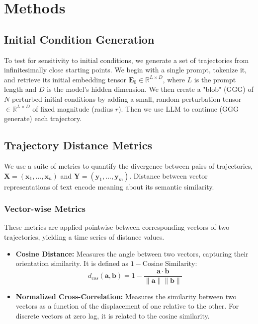 \documentclass[a4paper,12pt]{article}
\begin{document}

\section{Methods}

\subsection{Initial Condition Generation}
To test for sensitivity to initial conditions, we generate a set of trajectories from infinitesimally close starting points. We begin with a single prompt, tokenize it, and retrieve its initial embedding tensor $\mathbf{E}_0 \in \mathbb{R}^{L \times D}$, where $L$ is the prompt length and $D$ is the model's hidden dimension. We then create a "blob" (GGG) of $N$ perturbed initial conditions by adding a small, random perturbation tensor $\in \mathbb{R}^{L \times D}$ of fixed magnitude (radius $r$). Then we use LLM to continue (GGG generate) each trajectory.

\subsection{Trajectory Distance Metrics}
We use a suite of metrics to quantify the divergence between pairs of trajectories, $\mathbf{X} = (\mathbf{x}_1, ..., \mathbf{x}_n)$ and $\mathbf{Y} = (\mathbf{y}_1, ..., \mathbf{y}_m)$. Distance between vector representations of text encode meaning about its semantic similarity.

\subsubsection{Vector-wise Metrics}
These metrics are applied pointwise between corresponding vectors of two trajectories, yielding a time series of distance values.
\begin{itemize}
    \item \textbf{Cosine Distance:} Measures the angle between two vectors, capturing their orientation similarity. It is defined as $1 - \text{Cosine Similarity}$:
    \begin{equation}
        d_{cos}(\mathbf{a}, \mathbf{b}) = 1 - \frac{\mathbf{a} \cdot \mathbf{b}}{\|\mathbf{a}\| \|\mathbf{b}\|}
    \end{equation}
    \item \textbf{Normalized Cross-Correlation:} Measures the similarity between two vectors as a function of the displacement of one relative to the other. For discrete vectors at zero lag, it is related to the cosine similarity.
\end{itemize}
\end{document}
